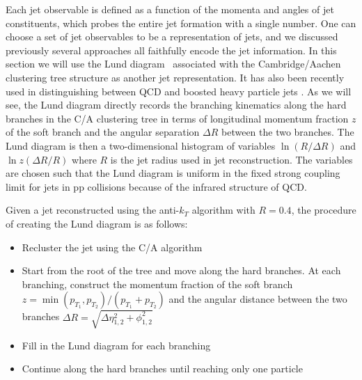 \documentclass[notoc]{JHEP3}
\begin{document}
Each jet observable is defined as a function of the momenta and angles of jet constituents, which probes the entire jet formation with a single number. One can choose a set of jet observables to be a representation of jets, and we discussed previously several approaches all faithfully encode the jet information. In this section we will use the Lund diagram~\cite{Andersson1989} associated with the Cambridge/Aachen clustering tree structure as another jet representation. It has also been recently used in distinguishing between QCD and boosted heavy particle jets \cite{Salam:2016yht}. As we will see, the Lund diagram directly records the branching kinematics along the hard branches in the C/A clustering tree in terms of longitudinal momentum fraction $z$ of the soft branch and the angular separation $\Delta R$ between the two branches. The Lund diagram is then a two-dimensional histogram of variables $\ln (R/\Delta R)$ and $\ln z(\Delta R/R)$ where $R$ is the jet radius used in jet reconstruction. The variables are chosen such that the Lund diagram is uniform in the fixed strong coupling limit for jets in pp collisions because of the infrared structure of QCD.

Given a jet reconstructed using the anti-$k_{T}$ algorithm with $R = 0.4$, the procedure of creating the Lund diagram is as follows:
\begin{itemize}
	\item Recluster the jet using the C/A algorithm
	\item Start from the root of the tree and move along the hard branches. At each branching, construct the momentum fraction of the soft branch $z=\min(p_{T_1},p_{T_2})/(p_{T_1}+p_{T_2})$ and the angular distance between the two branches $\Delta R = \sqrt{\Delta \eta^2_{1, 2}+\phi^2_{1, 2}}$
	\item Fill in the Lund diagram for each branching
	\item Continue along the hard branches until reaching only one particle
\end{itemize}
\end{document}
